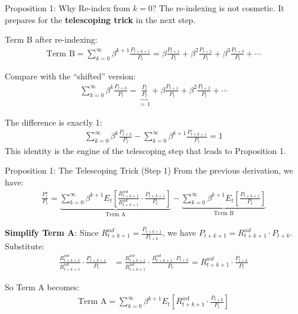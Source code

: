 \documentclass{beamer}
\begin{document}
\begin{frame}{Proposition 1: Why Re-index from $k=0$?}
	The re-indexing is not cosmetic. It prepares for the \textbf{telescoping trick} in the next step.

	\vspace{5pt}
	Term B after re-indexing:
	\begin{align*}
		\text{Term B} = \sum_{k=0}^{\infty} \beta^{k+1} \frac{P_{t+k+1}}{P_t} = \beta \frac{P_{t+1}}{P_t} + \beta^2 \frac{P_{t+2}}{P_t} + \beta^3 \frac{P_{t+3}}{P_t} + \cdots
	\end{align*}

	Compare with the ``shifted'' version:
	\begin{align*}
		\sum_{k=0}^{\infty} \beta^{k} \frac{P_{t+k}}{P_t} = \underbrace{\frac{P_{t}}{P_t}}_{=\,1} + \beta \frac{P_{t+1}}{P_t} + \beta^2 \frac{P_{t+2}}{P_t} + \cdots
	\end{align*}

	The difference is exactly 1:
	\begin{align*}
		\sum_{k=0}^{\infty} \beta^{k} \frac{P_{t+k}}{P_t} - \sum_{k=0}^{\infty} \beta^{k+1} \frac{P_{t+k+1}}{P_t} = 1
	\end{align*}
	This identity is the engine of the telescoping step that leads to Proposition 1.
\end{frame}

\begin{frame}{Proposition 1: The Telescoping Trick (Step 1)}
	From the previous derivation, we have:
	\begin{align*}
		\frac{P_t^\star}{P_t} = \underbrace{\sum_{k=0}^{\infty} \beta^{k+1} E_t\!\left[\frac{R_{t+k+1}^{wd}}{R_{t+k+1}^{nd}} \cdot \frac{P_{t+k+1}}{P_t}\right]}_{\text{Term A}} - \underbrace{\sum_{k=0}^{\infty} \beta^{k+1} E_t\!\left[\frac{P_{t+k+1}}{P_t}\right]}_{\text{Term B}}
	\end{align*}

	\textbf{Simplify Term A}: Since $R_{t+k+1}^{nd} = \frac{P_{t+k+1}}{P_{t+k}}$, we have $P_{t+k+1} = R_{t+k+1}^{nd} \cdot P_{t+k}$. Substitute:
	\begin{align*}
		\frac{R_{t+k+1}^{wd}}{R_{t+k+1}^{nd}} \cdot \frac{P_{t+k+1}}{P_t} &= \frac{R_{t+k+1}^{wd}}{R_{t+k+1}^{nd}} \cdot \frac{R_{t+k+1}^{nd} \cdot P_{t+k}}{P_t} = R_{t+k+1}^{wd} \cdot \frac{P_{t+k}}{P_t}
	\end{align*}

	So Term A becomes:
	\begin{align*}
		\text{Term A} = \sum_{k=0}^{\infty} \beta^{k+1} E_t\!\left[R_{t+k+1}^{wd} \cdot \frac{P_{t+k}}{P_t}\right]
	\end{align*}
\end{frame}
\end{document}
